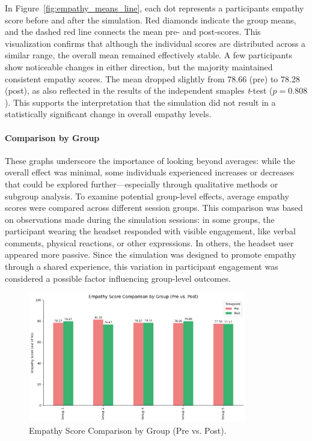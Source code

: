 \vspace{1em}

In Figure~\ref{fig:empathy_means_line}, each dot represents a participants empathy score before and after the simulation. Red diamonds indicate the group means, and the dashed red line connects the mean pre- and post-scores. This visualization confirms that although the individual scores are distributed across a similar range, the overall mean remained effectively stable. A few participants show noticeable changes in either direction, but the majority maintained consistent empathy scores. The mean dropped slightly from 78.66 (pre) to 78.28 (post), as also reflected in the results of the independent smaples \textit{t}-test ($p = 0.808$). This supports the interpretation that the simulation did not result in a statistically significant change in overall empathy levels.

\paragraph{Comparison by Group}

These graphs underscore the importance of looking beyond averages: while the overall effect was minimal, some individuals experienced increases or decreases that could be explored further—especially through qualitative methods or subgroup analysis. To examine potential group-level effects, average empathy scores were compared across different session groups. This comparison was based on observations made during the simulation sessions: in some groups, the participant wearing the headset responded with visible engagement, like verbal comments, physical reactions, or other expressions. In others, the headset user appeared more passive. Since the simulation was designed to promote empathy through a shared experience, this variation in participant engagement was considered a possible factor influencing group-level outcomes.


\begin{figure}[htbp]
    \centering
    \includegraphics[width=0.85\textwidth]{../../Figures/emph-scores-comp-grp.png}
    \caption{Empathy Score Comparison by Group (Pre vs. Post).}
    \label{fig:empathy_group_bar}
\end{figure}

